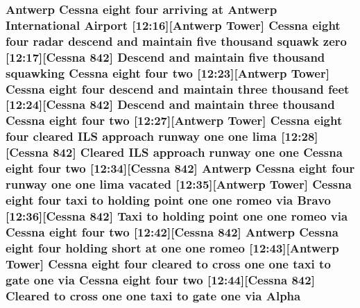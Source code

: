 \subsubsection[{\texorpdfstring{Alpha}{Alpha}}]{\setlength{\rightskip}{0pt plus 5cm}Antwerp {\bf Cessna} eight four arriving at Antwerp International {\bf Airport} \mbox{[}12\+:16\mbox{]}\mbox{[}Antwerp {\bf Tower}\mbox{]} {\bf Cessna} eight four radar descend and maintain five {\bf thousand} squawk {\bf zero} \mbox{[}12\+:17\mbox{]}\mbox{[}{\bf Cessna} 842\mbox{]} Descend and maintain five {\bf thousand} {\bf squawking} {\bf Cessna} eight four {\bf two} \mbox{[}12\+:23\mbox{]}\mbox{[}Antwerp {\bf Tower}\mbox{]} {\bf Cessna} eight four descend and maintain three {\bf thousand} {\bf feet} \mbox{[}12\+:24\mbox{]}\mbox{[}{\bf Cessna} 842\mbox{]} Descend and maintain three {\bf thousand} {\bf Cessna} eight four {\bf two} \mbox{[}12\+:27\mbox{]}\mbox{[}Antwerp {\bf Tower}\mbox{]} {\bf Cessna} eight four cleared I\+LS approach runway {\bf one} {\bf one} {\bf lima} \mbox{[}12\+:28\mbox{]}\mbox{[}{\bf Cessna} 842\mbox{]} Cleared I\+LS approach runway {\bf one} {\bf one} {\bf Cessna} eight four {\bf two} \mbox{[}12\+:34\mbox{]}\mbox{[}{\bf Cessna} 842\mbox{]} Antwerp {\bf Cessna} eight four runway {\bf one} {\bf one} {\bf lima} vacated \mbox{[}12\+:35\mbox{]}\mbox{[}Antwerp {\bf Tower}\mbox{]} {\bf Cessna} eight four taxi to holding point {\bf one} {\bf one} {\bf romeo} via {\bf Bravo} \mbox{[}12\+:36\mbox{]}\mbox{[}{\bf Cessna} 842\mbox{]} Taxi to holding point {\bf one} {\bf one} {\bf romeo} via {\bf Cessna} eight four {\bf two} \mbox{[}12\+:42\mbox{]}\mbox{[}{\bf Cessna} 842\mbox{]} Antwerp {\bf Cessna} eight four holding short at {\bf one} {\bf one} {\bf romeo} \mbox{[}12\+:43\mbox{]}\mbox{[}Antwerp {\bf Tower}\mbox{]} {\bf Cessna} eight four cleared to cross {\bf one} {\bf one} taxi to gate {\bf one} via {\bf Cessna} eight four {\bf two} \mbox{[}12\+:44\mbox{]}\mbox{[}{\bf Cessna} 842\mbox{]} Cleared to cross {\bf one} {\bf one} taxi to gate {\bf one} via Alpha}\hypertarget{happyDay2ExpectedATC_8txt_a7cf1abcb586a9ec58895379b2b8c1654}{}\label{happyDay2ExpectedATC_8txt_a7cf1abcb586a9ec58895379b2b8c1654}
